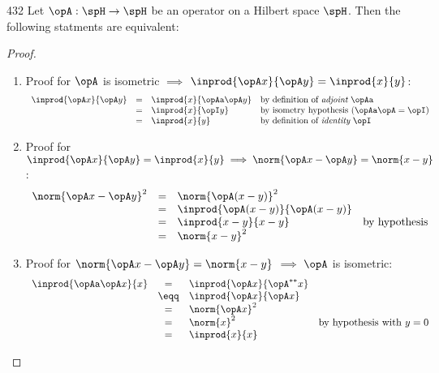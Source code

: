 \begin{theorem}
\citep{michel}{432}
Let $\opA:\spH\to\spH$ be an operator on a Hilbert space $\spH$.
Then the following statments are equivalent:
\end{theorem}
\begin{proof}
\begin{enumerate}
\item Proof for $\opA$ is isometric $\implies$ $\inprod{\opA x}{\opA y}=\inprod{x}{y}$:
\[\begin{array}{rcll}
  \inprod{\opA x}{\opA y}
    &=& \inprod{x}{\opAa \opA y} & \mbox{by definition of {\em adjoint} $\opAa$}
  \\&=& \inprod{x}{\opI y}       & \mbox{by isometry hypothesis ($\opAa\opA=\opI$)}
  \\&=& \inprod{x}{y}            & \mbox{by definition of {\em identity} $\opI$}
\end{array}\]

\item Proof for 
      $\inprod{\opA x}{\opA y}=\inprod{x}{y} \implies \norm{\opA x-\opA y}=\norm{x-y}$:
\[\begin{array}{rcll}
  \norm{\opA x - \opA y}^2
    &=& \norm{\opA(x-y)}^2
  \\&=& \inprod{\opA(x-y)}{\opA(x-y)}  
  \\&=& \inprod{x-y}{x-y}              & \mbox{by hypothesis}
  \\&=& \norm{x-y}^2
\end{array}\]

\item Proof for $\norm{\opA x-\opA y}=\norm{x-y}$ $\implies$ $\opA$ is isometric: \attention
\[\begin{array}{rcll}
  \inprod{\opAa\opA x}{x}
    &=&    \inprod{\opA x}{\opA^{\ast\ast} x}
  \\&\eqq& \inprod{\opA x}{\opA x}
  \\&=&    \norm{\opA x}^2
  \\&=&    \norm{x}^2   & \mbox{by hypothesis with $y=0$}
  \\&=&    \inprod{x}{x}
\end{array}\]


\end{enumerate}
\end{proof}





